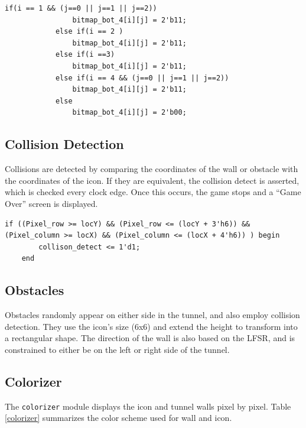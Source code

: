\documentclass[11pt]{article}
\begin{document}
\begin{lstlisting}[caption=Example Icon creation, label=hammer]		
			if(i == 1 && (j==0 || j==1 || j==2))
				bitmap_bot_4[i][j] = 2'b11;			
			else if(i == 2 )
				bitmap_bot_4[i][j] = 2'b11;	
			else if(i ==3)
				bitmap_bot_4[i][j] = 2'b11;			
			else if(i == 4 && (j==0 || j==1 || j==2))
				bitmap_bot_4[i][j] = 2'b11;						
			else
				bitmap_bot_4[i][j] = 2'b00;	
 \end{lstlisting}



\subsection{Collision Detection}	
		Collisions are detected by comparing the coordinates of the wall or obstacle with the coordinates of the icon.  If they are equivalent, the collision detect is asserted, which is checked every clock edge. Once this occurs, the game stops and a ``Game Over'' screen is displayed.  

\begin{lstlisting}[caption=Collision Detection Logic, label=collision]		
	if ((Pixel_row >= locY) && (Pixel_row <= (locY + 3'h6)) && (Pixel_column >= locX) && (Pixel_column <= (locX + 4'h6)) ) begin
		collison_detect <= 1'd1;
	end	
 \end{lstlisting}
 
 
\subsection{Obstacles}
	Obstacles randomly appear on either side in the tunnel, and also employ collision detection.  They use the icon's size (6x6) and extend the height to transform into a rectangular shape. The direction of the wall is also based on the LFSR, and is constrained to either be on the left or right side of the tunnel.
		
\subsection{Colorizer}

The \texttt{colorizer} module displays the icon and tunnel walls pixel by pixel.  Table \ref{colorizer} summarizes the color scheme used for wall and icon.
 
\end{document}
